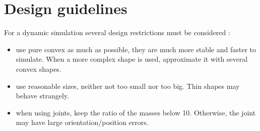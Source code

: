 \chapter{Design guidelines}
For a dynamic simulation several design restrictions must be considered : \begin{itemize}
\item use pure convex as much as possible, they are much more stable and faster to simulate. When a more complex shape is used, approximate it with several convex shapes.

\item use reasonable sizes, neither not too small nor too big. Thin shapes may behave strangely.

\item when using joints, keep the ratio of the masses below 10. Otherwise, the joint may have large orientation/position errors.
\end{itemize}